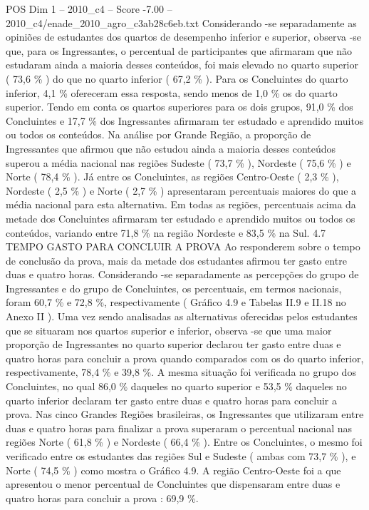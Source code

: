 \begin{textsample}{POS Dim 1 – 2010\_c4 – Score -7.00 – 2010\_c4/enade\_2010\_agro\_c3ab28c6eb.txt}
Considerando -se separadamente as opiniões de estudantes dos quartos de desempenho inferior e superior, observa -se que, para os Ingressantes, o percentual de participantes que afirmaram que não estudaram ainda a maioria desses conteúdos, foi mais elevado no quarto superior ( 73,6 \% ) do que no quarto inferior ( 67,2 \% ).
Para os Concluintes do quarto inferior, 4,1 \% ofereceram essa resposta, sendo menos de 1,0 \% os do quarto superior.
Tendo em conta os quartos superiores para os dois grupos, 91,0 \% dos Concluintes e 17,7 \% dos Ingressantes afirmaram ter estudado e aprendido muitos ou todos os conteúdos.
Na análise por Grande Região, a proporção de Ingressantes que afirmou que não estudou ainda a maioria desses conteúdos superou a média nacional nas regiões Sudeste ( 73,7 \% ), Nordeste ( 75,6 \% ) e Norte ( 78,4 \% ).
Já entre os Concluintes, as regiões Centro-Oeste ( 2,3 \% ), Nordeste ( 2,5 \% ) e Norte ( 2,7 \% ) apresentaram percentuais maiores do que a média nacional para esta alternativa.
Em todas as regiões, percentuais acima da metade dos Concluintes afirmaram ter estudado e aprendido muitos ou todos os conteúdos, variando entre 71,8 \% na região Nordeste e 83,5 \% na Sul. 4.7 TEMPO GASTO PARA CONCLUIR A PROVA Ao responderem sobre o tempo de conclusão da prova, mais da metade dos estudantes afirmou ter gasto entre duas e quatro horas.
Considerando -se separadamente as percepções do grupo de Ingressantes e do grupo de Concluintes, os percentuais, em termos nacionais, foram 60,7 \% e 72,8 \%, respectivamente ( Gráfico 4.9 e Tabelas II.9 e II.18 no Anexo II ).
Uma vez sendo analisadas as alternativas oferecidas pelos estudantes que se situaram nos quartos superior e inferior, observa -se que uma maior proporção de Ingressantes no quarto superior declarou ter gasto entre duas e quatro horas para concluir a prova quando comparados com os do quarto inferior, respectivamente, 78,4 \% e 39,8 \%.
A mesma situação foi verificada no grupo dos Concluintes, no qual 86,0 \% daqueles no quarto superior e 53,5 \% daqueles no quarto inferior declaram ter gasto entre duas e quatro horas para concluir a prova.
Nas cinco Grandes Regiões brasileiras, os Ingressantes que utilizaram entre duas e quatro horas para finalizar a prova superaram o percentual nacional nas regiões Norte ( 61,8 \% ) e Nordeste ( 66,4 \% ).
Entre os Concluintes, o mesmo foi verificado entre os estudantes das regiões Sul e Sudeste ( ambas com 73,7 \% ), e Norte ( 74,5 \% ) como mostra o Gráfico 4.9.
A região Centro-Oeste foi a que apresentou o menor percentual de Concluintes que dispensaram entre duas e quatro horas para concluir a prova : 69,9 \%.

\end{textsample}
